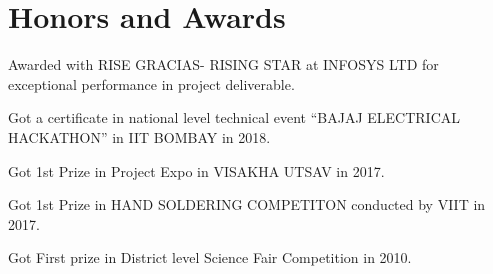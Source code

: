 \section{Honors and Awards}
\begin{description}[font=$\bullet$]
\item {Awarded with RISE GRACIAS- RISING STAR at INFOSYS LTD for exceptional performance in project deliverable.}
\vspace{-18pt}
\item {Got a certificate in national level technical event “BAJAJ ELECTRICAL HACKATHON” in
IIT BOMBAY in 2018.}
\vspace{-5pt}
\item {Got 1st Prize in Project Expo in VISAKHA UTSAV in 2017.}
\vspace{-5pt}
\item {Got 1st Prize in HAND SOLDERING COMPETITON conducted by VIIT in 2017.}
\vspace{-5pt}
\item {Got First prize in District level Science Fair Competition in 2010.}
\end{description}